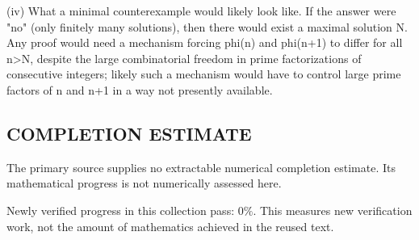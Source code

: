 (iv) What a minimal counterexample would likely look like.
If the answer were "no" (only finitely many solutions), then there would exist a maximal solution N. Any proof would need a mechanism forcing phi(n) and phi(n+1) to differ for all n>N, despite the large combinatorial freedom in prime factorizations of consecutive integers; likely such a mechanism would have to control large prime factors of n and n+1 in a way not presently available.




\subsection*{COMPLETION ESTIMATE}
The primary source supplies no extractable numerical completion estimate. Its mathematical progress is not numerically assessed here.

Newly verified progress in this collection pass: $0\%$. This measures new verification work, not the amount of mathematics achieved in the reused text.
